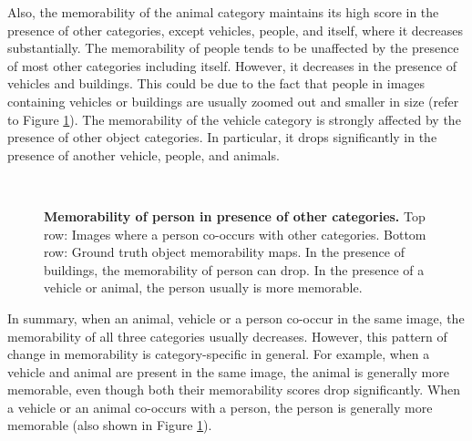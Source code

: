 Also, the memorability of the animal category maintains its high score in the presence of other categories, except vehicles, people, and itself, where it decreases substantially. The memorability of people tends to be unaffected by the presence of most other categories including itself. However, it decreases in the presence of vehicles and buildings. This could be due to the fact that people in images containing vehicles or buildings are usually zoomed out and smaller in size (refer to Figure \ref{fig:qualInterClass}). The memorability of the vehicle category is strongly affected by the presence of other object categories. In particular, it drops significantly in the presence of another vehicle, people, and animals.


\begin{figure}[t]
\centering
{}
\\
\vspace{-2mm}
\vspace{-5mm}\caption{\footnotesize\textbf{Memorability of person in presence of other categories.} Top row: Images where a person co-occurs with other categories. Bottom row: Ground truth object memorability maps. In the presence of buildings, the memorability of person can drop. In the presence of a vehicle or animal, the person usually is more memorable. }\label{fig:qualInterClass}
\end{figure}

In summary, when an animal, vehicle or a person co-occur in the same image, the memorability of all three categories usually decreases. However, this pattern of change in memorability is category-specific in general. For example, when a vehicle and animal are present in the same image, the animal is generally more memorable, even though both their memorability scores drop significantly. When a vehicle or an animal co-occurs with a person, the person is generally more memorable (also shown in Figure \ref{fig:qualInterClass}).





